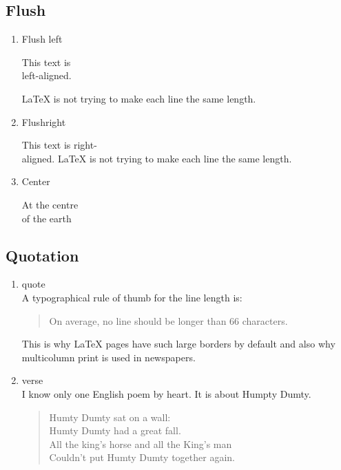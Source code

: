 \documentclass[12pt]{article}
\begin{document}
\subsection{Flush}
\begin{enumerate}
	\item Flush left
	      \begin{flushleft}
		      This text is\\ left-aligned.

		      \LaTeX{} is not trying to make each line the same length.
	      \end{flushleft}
	\item Flushright
	      \begin{flushright}
		      This text is right-\\aligned.
		      \LaTeX{} is not trying to make each line the same length.
	      \end{flushright}
	\item{Center}
	      \begin{center}
		      At the centre\\of the earth
	      \end{center}
\end{enumerate}
\subsection{Quotation}
\begin{enumerate}
	\item quote\\
	      A typographical rule of thumb for the line length is:
	      \begin{quote}
		      On average, no line should be longer than 66 characters.
	      \end{quote}
	      This is why \LaTeX{} pages have such large borders by default and also why multicolumn print is used in newspapers.
	\item verse\\
	      I know only one English poem by heart. It is about Humpty Dumty.
	      \begin{flushleft}
		      \begin{verse}
			      Humty Dumty sat on a wall:\\
			      Humty Dumty had a great fall.\\
			      All the king's horse and all the King's man\\
			      Couldn't put Humty Dumty together again.
		      \end{verse}
	      \end{flushleft}
\end{enumerate}
\end{document}
